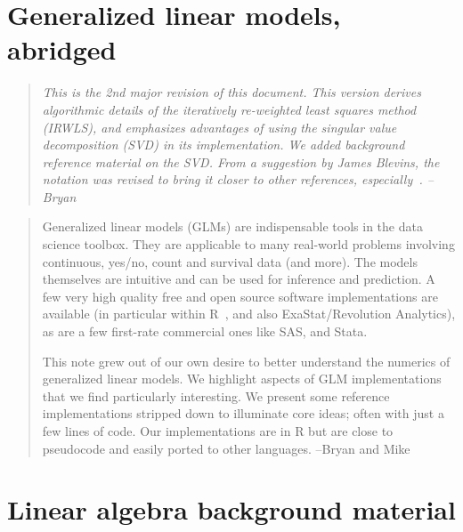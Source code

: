 \documentclass[10pt]{article} %
\begin{document}

\setlength{\parindent}{0pt}
\setlength{\parskip}{0.2em}



\section*{Generalized linear models, abridged}

\begin{quote}
{\it This is the 2nd major revision of this document. This version derives
algorithmic details of the iteratively re-weighted least squares method
(IRWLS), and emphasizes advantages of using the singular value decomposition
(SVD) in its implementation. We added background reference material on the SVD.
From a suggestion by James Blevins, the notation was revised to bring it closer
to other references, especially~\cite{MN}.
--Bryan}
\end{quote}

\begin{quote}
Generalized linear models (GLMs) are indispensable tools in the data science
toolbox. They are applicable to many real-world problems involving continuous,
yes/no, count and survival data (and more). The models themselves are intuitive
and can be used for inference and prediction.  A few very high quality free and
open source software implementations are available (in particular within
R~\cite{R}, and also ExaStat/Revolution Analytics), as are a few first-rate
commercial ones like SAS, and Stata.

This note grew out of our own desire to better understand the numerics of
generalized linear models.  We highlight aspects of GLM implementations that we
find particularly interesting. We present some reference implementations
stripped down to illuminate core ideas; often with just a few lines of code.
Our implementations are in R but are close to pseudocode and easily ported to
other languages. --Bryan and Mike
\end{quote}


\section*{Linear algebra background material}
\end{document}

